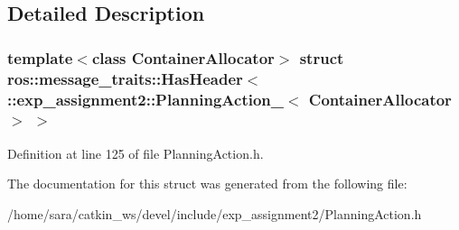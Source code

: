 \subsection{Detailed Description}
\subsubsection*{template$<$class Container\+Allocator$>$\newline
struct ros\+::message\+\_\+traits\+::\+Has\+Header$<$ \+::exp\+\_\+assignment2\+::\+Planning\+Action\+\_\+$<$ Container\+Allocator $>$ $>$}



Definition at line 125 of file Planning\+Action.\+h.



The documentation for this struct was generated from the following file\+:\begin{DoxyCompactItemize}
\item 
/home/sara/catkin\+\_\+ws/devel/include/exp\+\_\+assignment2/Planning\+Action.\+h\end{DoxyCompactItemize}

